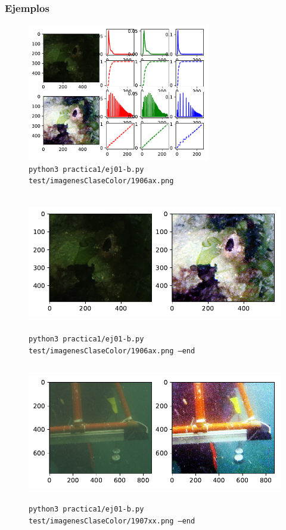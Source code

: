 \documentclass[11pt, spanish]{article}
\begin{document}
\subsubsection*{Ejemplos}
\begin{figure}[H]
\centering
  \includegraphics[height=6cm]{informe-imgs/ej01-b-1.pdf}
  \caption{\texttt{python3 practica1/ej01-b.py test/imagenesClaseColor/1906ax.png}}
\end{figure}
\begin{figure}[H]
\centering
  \includegraphics[height=6cm]{informe-imgs/ej01-b-2.pdf}
  \caption{\texttt{python3 practica1/ej01-b.py test/imagenesClaseColor/1906ax.png --end}}
\end{figure}

\begin{figure}[H]
\centering
  \includegraphics[height=6cm]{informe-imgs/ej01-b-3.pdf}
  \caption{\texttt{python3 practica1/ej01-b.py test/imagenesClaseColor/1907xx.png --end}}
\end{figure}
\end{document}
